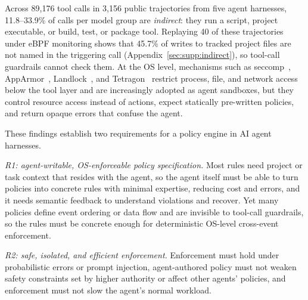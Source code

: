\label{sec:indirect}
Across 89{,}176 tool calls in 3{,}156 public trajectories from five agent harnesses, 11.8--33.9\% of calls per model group are \emph{indirect}: they run a script, project executable, or build, test, or package tool.
Replaying 40 of these trajectories under eBPF monitoring shows that 45.7\% of writes to tracked project files are not named in the triggering call (Appendix~\ref{sec:supp:indirect}), so tool-call guardrails cannot check them.
At the OS level, mechanisms such as seccomp~\cite{seccomp-bpf}, AppArmor~\cite{apparmor}, Landlock~\cite{landlock}, and Tetragon~\cite{ciliumtetragon} restrict process, file, and network access below the tool layer and are increasingly adopted as agent sandboxes, but they control resource access instead of actions, expect statically pre-written policies, and return opaque errors that confuse the agent.

 These findings establish two requirements for a policy engine in AI agent harnesses.

\emph{R1: agent-writable, OS-enforceable policy specification.}
Most rules need project or task context that resides with the agent, so the agent itself must be able to turn policies into concrete rules with minimal expertise, reducing cost and errors, and it needs semantic feedback to understand violations and recover.
Yet many policies define event ordering or data flow and are invisible to tool-call guardrails, so the rules must be concrete enough for deterministic OS-level cross-event enforcement.

\emph{R2: safe, isolated, and efficient enforcement.}
Enforcement must hold under probabilistic errors or prompt injection, agent-authored policy must not weaken safety constraints set by higher authority or affect other agents' policies, and enforcement must not slow the agent's normal workload.
